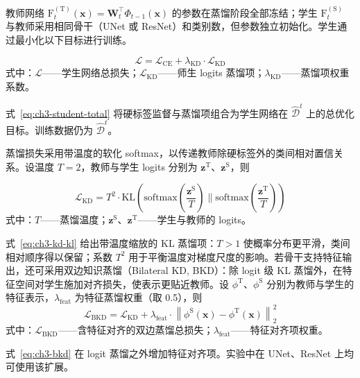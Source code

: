 教师网络 $\mathrm{F}_t^{\mathrm{(T)}}(\mathbf{x}) = \mathbf{W}_t^{\top} \Phi_{t-1}(\mathbf{x})$ 的参数在蒸馏阶段全部冻结；学生 $\mathrm{F}_t^{\mathrm{(S)}}$ 与教师采用相同骨干（UNet 或 ResNet）和类别数，但参数独立初始化。学生通过最小化以下目标进行训练。

\begin{equation}\label{eq:ch3-student-total}
\mathcal{L} = \mathcal{L}_{\mathrm{CE}} + \lambda_{\mathrm{KD}} \cdot \mathcal{L}_{\mathrm{KD}}
\end{equation}
\noindent 式中：$\mathcal{L}$——学生网络总损失；$\mathcal{L}_{\mathrm{KD}}$——师生 logits 蒸馏项；$\lambda_{\mathrm{KD}}$——蒸馏项权重系数。

式~\eqref{eq:ch3-student-total} 将硬标签监督与蒸馏项组合为学生网络在 $\hat{\mathcal{D}}^t$ 上的总优化目标。训练数据仍为 $\hat{\mathcal{D}}^t$。

蒸馏损失采用带温度的软化 softmax\cite{hinton2015distilling}，以传递教师除硬标签外的类间相对置信关系。设温度 $T=2$，教师与学生 logits 分别为 $\mathbf{z}^{\mathrm{T}}$、$\mathbf{z}^{\mathrm{S}}$，则

\begin{equation}\label{eq:ch3-kd-kl}
\mathcal{L}_{\mathrm{KD}} = T^2 \cdot \mathrm{KL}\left( \mathrm{softmax}\left(\frac{\mathbf{z}^{\mathrm{S}}}{T}\right) \Big\| \mathrm{softmax}\left(\frac{\mathbf{z}^{\mathrm{T}}}{T}\right) \right)
\end{equation}
\noindent 式中：$T$——蒸馏温度；$\mathbf{z}^{\mathrm{S}}$、$\mathbf{z}^{\mathrm{T}}$——学生与教师的 logits。

式~\eqref{eq:ch3-kd-kl} 给出带温度缩放的 KL 蒸馏项：$T>1$ 使概率分布更平滑，类间相对顺序得以保留；系数 $T^2$ 用于平衡温度对梯度尺度的影响。若骨干支持特征输出，还可采用双边知识蒸馏（Bilateral KD, BKD）：除 logit 级 KL 蒸馏外，在特征空间对学生施加对齐损失，使表示更贴近教师。设 $\phi^{\mathrm{T}}$、$\phi^{\mathrm{S}}$ 分别为教师与学生的特征表示，$\lambda_{\mathrm{feat}}$ 为特征蒸馏权重（取 0.5），则
\begin{equation}\label{eq:ch3-bkd}
\mathcal{L}_{\mathrm{BKD}} = \mathcal{L}_{\mathrm{KD}} + \lambda_{\mathrm{feat}} \cdot \left\| \phi^{\mathrm{S}}(\mathbf{x}) - \phi^{\mathrm{T}}(\mathbf{x}) \right\|_2^2
\end{equation}
\noindent 式中：$\mathcal{L}_{\mathrm{BKD}}$——含特征对齐的双边蒸馏总损失；$\lambda_{\mathrm{feat}}$——特征对齐项权重。

式~\eqref{eq:ch3-bkd} 在 logit 蒸馏之外增加特征对齐项。实验中在 UNet、ResNet 上均可使用该扩展。


